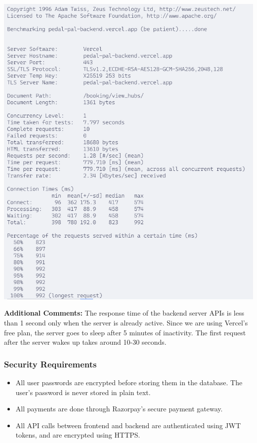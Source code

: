 \documentclass[11pt]{article}
\begin{document}
\begin{center}
    \includegraphics[scale=0.6]{unit_testing_codes/load_testing.png}
\end{center}
\textbf{Additional Comments: }The response time of the backend server APIs is less than 1 second only when the server is already active. Since we are using Vercel's free plan,  the server goes to sleep after 5 minutes of inactivity. The first request after the server wakes up takes around 10-30 seconds.

\subsubsection{Security Requirements}
\begin{itemize}
    \itemsep 0em
    \item All user passwords are encrypted before storing them in the database. The user's password is never stored in plain text.
    \item All payments are done through Razorpay's secure payment gateway.
    \item All API calls between frontend and backend are authenticated using JWT tokens, and are encrypted using HTTPS.
\end{itemize}
\end{document}
